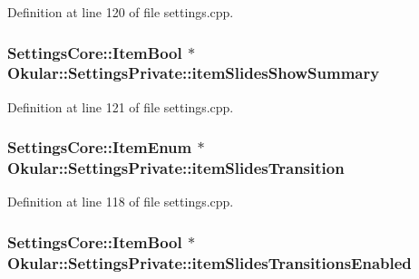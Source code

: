 Definition at line 120 of file settings.\+cpp.

\hypertarget{classOkular_1_1SettingsPrivate_a3cc39edeb6b2f692db32b97836ad4c95}{
\subsubsection[{item\+Slides\+Show\+Summary}]{\setlength{\rightskip}{0pt plus 5cm}Settings\+Core\+::\+Item\+Bool $\ast$ Okular\+::\+Settings\+Private\+::item\+Slides\+Show\+Summary}}\label{classOkular_1_1SettingsPrivate_a3cc39edeb6b2f692db32b97836ad4c95}


Definition at line 121 of file settings.\+cpp.

\hypertarget{classOkular_1_1SettingsPrivate_a8bffe2ed1e53f170465d9061dc123361}{
\subsubsection[{item\+Slides\+Transition}]{\setlength{\rightskip}{0pt plus 5cm}Settings\+Core\+::\+Item\+Enum $\ast$ Okular\+::\+Settings\+Private\+::item\+Slides\+Transition}}\label{classOkular_1_1SettingsPrivate_a8bffe2ed1e53f170465d9061dc123361}


Definition at line 118 of file settings.\+cpp.

\hypertarget{classOkular_1_1SettingsPrivate_aa0f6efe7077aeadbdbcbfa55afbf59e4}{
\subsubsection[{item\+Slides\+Transitions\+Enabled}]{\setlength{\rightskip}{0pt plus 5cm}Settings\+Core\+::\+Item\+Bool $\ast$ Okular\+::\+Settings\+Private\+::item\+Slides\+Transitions\+Enabled}}\label{classOkular_1_1SettingsPrivate_aa0f6efe7077aeadbdbcbfa55afbf59e4}


